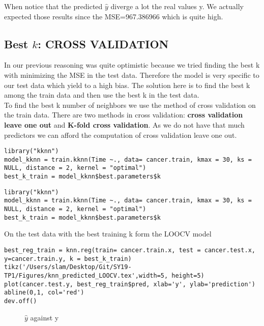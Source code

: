 \documentclass[]{report}
\begin{document}
When notice that the predicted {$\hat{y}$} diverge a lot the real values y. We actually expected those results since the MSE=967.386966 which is quite high. 


\subsection{Best $k$: CROSS VALIDATION}
In our previous reasoning was quite optimistic because we tried finding the best k with minimizing the MSE in the test data. Therefore the model is very specific to our test data which yield to a high bias. The solution here is to find the best k among the train data and then use the best k in the test data. \\ 
To find the best k number of neighbors we use the method of cross validation  on the train data. There are two methods in cross validation: \textbf{cross validation leave one out} and  \textbf{K-fold cross validation}. As we do not have that much predictors we can afford the computation of cross validation leave one out.\\

\begin{lstlisting}
library("kknn")
model_kknn = train.kknn(Time ~., data= cancer.train, kmax = 30, ks = NULL, distance = 2, kernel = "optimal")
best_k_train = model_kknn$best.parameters$k
\end{lstlisting}


\begin{lstlisting}
library("kknn")
model_kknn = train.kknn(Time ~., data= cancer.train, kmax = 30, ks = NULL, distance = 2, kernel = "optimal")
best_k_train = model_kknn$best.parameters$k
\end{lstlisting}


On the test data with the best training k form the LOOCV model	
	
\begin{lstlisting}
best_reg_train = knn.reg(train= cancer.train.x, test = cancer.test.x, y=cancer.train.y, k = best_k_train)
tikz('/Users/slam/Desktop/Git/SY19-TP1/Figures/knn_predicted_LOOCV.tex',width=5, height=5)
plot(cancer.test.y, best_reg_train$pred, xlab='y', ylab='prediction')
abline(0,1, col='red')
dev.off() 
\end{lstlisting}

\begin{figure}[!h]
	\centering
	
	\caption{$\hat{y}$ against y}
\end{figure}
\end{document}
